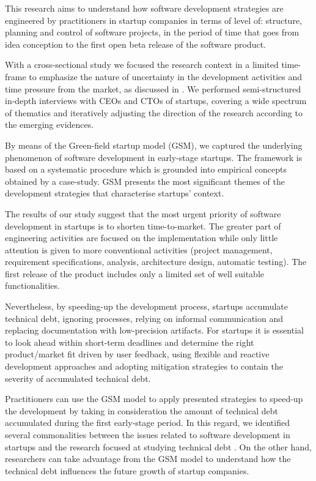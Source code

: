 \documentclass[10pt,journal,letterpaper,compsoc]{IEEEtran}
\begin{document}
This research aims to understand how software development strategies are engineered by practitioners in startup companies in terms of level of: structure, planning and control of software projects, in the period of time  that goes from idea conception to the first open beta release of the software product.

With a cross-sectional study we focused the research context in a limited time-frame to emphasize the nature of uncertainty in the development activities and time pressure from the market, as discussed in \cite{Maccormack2001, Eisenhardt1998}. We performed semi-structured in-depth interviews with CEOs and CTOs of startups, covering a wide spectrum of thematics and iteratively adjusting the direction of the research according to the emerging evidences.

By means of the Green-field startup model (GSM), we captured the underlying phenomenon of software development in early-stage startups. The framework is based on a systematic procedure  which is grounded into empirical concepts obtained by a case-study. GSM presents the most significant themes of the development strategies that characterise startups' context.

The results of our study suggest that the most urgent priority of software development in startups is to shorten time-to-market. The greater part of engineering activities are focused on the implementation while only little attention is given to more conventional activities (project management, requirement specifications, analysis, architecture design, automatic testing). The first release of the product includes only a limited set of well suitable functionalities.

Nevertheless, by speeding-up the development process, startups accumulate technical debt, ignoring processes, relying on informal communication and replacing documentation with low-precision artifacts. For startups it is essential to look ahead within short-term deadlines and determine the right product/market fit driven by user feedback, using flexible and reactive development approaches and adopting mitigation strategies to contain the severity of accumulated technical debt. 

Practitioners can use the GSM model to apply presented strategies to speed-up the development by taking in consideration the amount of technical debt accumulated during the first early-stage period. In this regard, we identified several commonalities between the issues related to software development in startups and the research focused at studying technical debt \cite{Nugroho2011,Izurieta2012}. On the other hand, researchers can take advantage from the GSM model to understand how the technical debt influences the future growth of startup companies.
\end{document}
